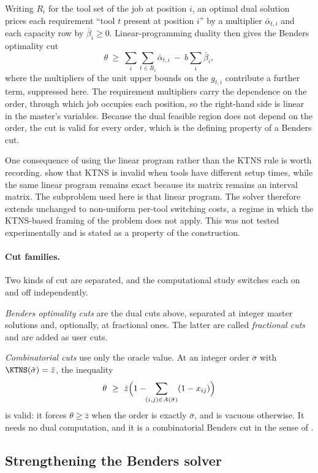 Writing $R_i$ for the tool set of the job at position $i$, an optimal dual solution
prices each requirement ``tool $t$ present at position $i$'' by a multiplier
$\bar\alpha_{t,i}$ and each capacity row by $\bar\beta_i\ge0$. Linear-programming
duality then gives the Benders optimality cut
\[
  \theta\ \ge\ \sum_i\sum_{t\in R_i}\bar\alpha_{t,i}\ -\ b\sum_i\bar\beta_i,
\]
where the multipliers of the unit upper bounds on the $g_{t,i}$ contribute a further
term, suppressed here. The requirement multipliers carry the dependence on the order,
through which job occupies each position, so the right-hand side is linear in the
master's variables. Because the dual feasible region does not depend on the order, the
cut is valid for every order, which is the defining property of a Benders cut.

One consequence of using the linear program rather than the KTNS rule is worth
recording. \citet{Crama1994} show that KTNS is invalid when tools have different setup
times, while the same linear program remains exact because its matrix remains an
interval matrix. The subproblem used here is that linear program. The solver therefore
extends unchanged to non-uniform per-tool switching costs, a regime in which the
KTNS-based framing of the problem does not apply. This was not tested experimentally
and is stated as a property of the construction.

\paragraph{Cut families.}
Two kinds of cut are separated, and the computational study switches each on and off
independently.

\emph{Benders optimality cuts} are the dual cuts above, separated at integer master
solutions and, optionally, at fractional ones. The latter are called
\emph{fractional cuts} and are added as user cuts.

\emph{Combinatorial cuts} use only the oracle value. At an integer order
$\bar\sigma$ with $\KTNS(\bar\sigma)=\bar z$, the inequality
\[
  \theta\ \ge\ \bar z\Bigl(1-\!\!\sum_{(i,j)\in A(\bar\sigma)}(1-x_{ij})\Bigr)
\]
is valid: it forces $\theta\ge\bar z$ when the order is exactly $\bar\sigma$, and is
vacuous otherwise. It needs no dual computation, and it is a combinatorial Benders cut
in the sense of \citet{Codato2006}.

\subsection{Strengthening the Benders solver}\label{ssec:accel}

